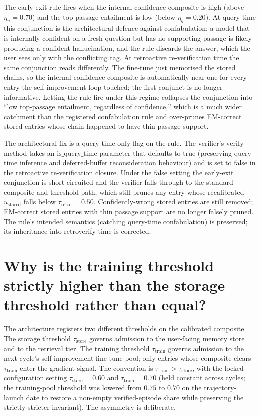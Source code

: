 The early-exit rule fires when the internal-confidence composite is high (above $\eta_u = 0.70$) and the top-passage entailment is low (below $\eta_g = 0.20$). At query time this conjunction is the architectural defence against confabulation: a model that is internally confident on a fresh question but has no supporting passage is likely producing a confident hallucination, and the rule discards the answer, which the user sees only with the conflicting tag. At retroactive re-verification time the same conjunction reads differently. The fine-tune just memorised the stored chains, so the internal-confidence composite is automatically near one for every entry the self-improvement loop touched; the first conjunct is no longer informative. Letting the rule fire under this regime collapses the conjunction into ``low top-passage entailment, regardless of confidence,'' which is a much wider catchment than the registered confabulation rule and over-prunes EM-correct stored entries whose chain happened to have thin passage support.

The architectural fix is a query-time-only flag on the rule. The verifier's $\mathrm{verify}$ method takes an $\mathrm{is\_query\_time}$ parameter that defaults to true (preserving query-time inference and deferred-buffer reconsideration behaviour) and is set to false in the retroactive re-verification closure. Under the false setting the early-exit conjunction is short-circuited and the verifier falls through to the standard composite-and-threshold path, which still prunes any entry whose recalibrated $u_{\text{stored}}$ falls below $\tau_{\text{retro}} = 0.50$. Confidently-wrong stored entries are still removed; EM-correct stored entries with thin passage support are no longer falsely pruned. The rule's intended semantics (catching query-time confabulation) is preserved; its inheritance into retroverify-time is corrected.


\section[Training vs storage threshold]{Why is the training threshold strictly higher than the storage threshold rather than equal?}
\label{app:qa-tau-train-vs-store}

The architecture registers two different thresholds on the calibrated composite. The storage threshold $\tau_{\text{store}}$ governs admission to the user-facing memory store and to the retrieval tier. The training threshold $\tau_{\text{train}}$ governs admission to the next cycle's self-improvement fine-tune pool; only entries whose composite clears $\tau_{\text{train}}$ enter the gradient signal. The convention is $\tau_{\text{train}} > \tau_{\text{store}}$, with the locked configuration setting $\tau_{\text{store}} = 0.60$ and $\tau_{\text{train}} = 0.70$ (held constant across cycles; the training-pool threshold was lowered from $0.75$ to $0.70$ on the trajectory-launch date to restore a non-empty verified-episode share while preserving the strictly-stricter invariant). The asymmetry is deliberate.

